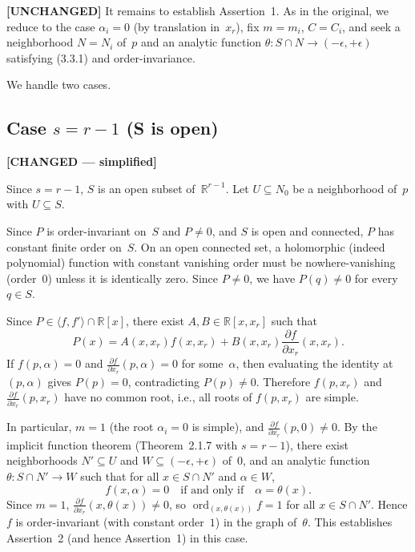 \documentclass[11pt]{article}
\theoremstyle{plain}
\theoremstyle{definition}
\newcommand{\R}{\mathbb{R}}
\DeclareMathOperator{\ord}{ord}
\begin{document}
\textbf{[UNCHANGED]}
It remains to establish Assertion~1.  As in the original, we reduce to
the case $\alpha_i = 0$ (by translation in~$x_r$), fix
$m = m_i$, $C = C_i$, and seek a neighborhood $N = N_i$ of~$p$ and an
analytic function $\theta : S \cap N \to (-\epsilon, +\epsilon)$
satisfying (3.3.1) and order-invariance.

We handle two cases.

\subsection{Case \texorpdfstring{$s = r - 1$}{s = r - 1}
  (S is open)}
\label{ssec:case_open}

\textbf{[CHANGED --- simplified]}

Since $s = r - 1$, $S$ is an open subset of~$\R^{r-1}$.  Let $U \subseteq N_0$
be a neighborhood of~$p$ with $U \subseteq S$.

Since $P$ is order-invariant on~$S$ and $P \ne 0$, and $S$ is open and
connected, $P$ has constant finite order on~$S$.  On an open connected set,
a holomorphic (indeed polynomial) function with constant vanishing order
must be nowhere-vanishing (order~$0$) unless it is identically zero.
Since $P \ne 0$, we have $P(q) \ne 0$ for every $q \in S$.

Since $P \in \langle f, f' \rangle \cap \R[x]$, there exist
$A, B \in \R[x, x_r]$ such that
\[
  P(x) = A(x, x_r) f(x, x_r) + B(x, x_r) \frac{\partial f}{\partial x_r}(x, x_r).
\]
If $f(p, \alpha) = 0$ and $\frac{\partial f}{\partial x_r}(p, \alpha) = 0$
for some~$\alpha$, then evaluating the identity at $(p, \alpha)$ gives
$P(p) = 0$, contradicting $P(p) \ne 0$.  Therefore $f(p, x_r)$ and
$\frac{\partial f}{\partial x_r}(p, x_r)$ have no common root, i.e., all
roots of $f(p, x_r)$ are simple.

In particular, $m = 1$ (the root $\alpha_i = 0$ is simple), and
$\frac{\partial f}{\partial x_r}(p, 0) \ne 0$.  By the implicit function
theorem (Theorem~2.1.7 with $s = r - 1$), there exist neighborhoods
$N' \subseteq U$ and $W \subseteq (-\epsilon, +\epsilon)$ of~$0$, and an
analytic function $\theta : S \cap N' \to W$ such that for all
$x \in S \cap N'$ and $\alpha \in W$,
\[
  f(x, \alpha) = 0 \quad\text{if and only if}\quad \alpha = \theta(x).
\]
Since $m = 1$, $\frac{\partial f}{\partial x_r}(x, \theta(x)) \ne 0$,
so $\ord_{(x, \theta(x))} f = 1$ for all $x \in S \cap N'$.  Hence $f$
is order-invariant (with constant order~$1$) in the graph of~$\theta$.
This establishes Assertion~2 (and hence Assertion~1) in this case.
\end{document}
